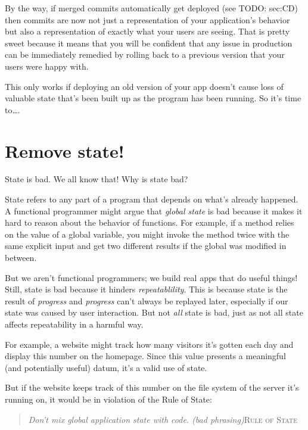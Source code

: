 \documentclass{article}
\newcommand{\noterm}[1]{\textit{#1}}
\newcommand{\term}[1]{\noterm{#1}\index{#1}}
\newcommand{\newp}{\newline\indent}
\newcommand{\imp}[2]{
  \begin{quote}
    \textit{#2}\newp \textsc{#1}
  \end{quote}
}
\begin{document}
By the way, if merged commits automatically get deployed (see TODO: sec:CD) then commits are now not just a representation of your application's behavior but also a representation of exactly what your users are seeing.
That is pretty sweet because it means that you will be confident that any issue in production can be immediately remedied by rolling back to a previous version that your users were happy with.

This only works if deploying an old version of your app doesn't cause loss of valuable state that's been built up as the program has been running.
So it's time to\ldots.

\section{Remove state!}

State is bad.
We all know that!
Why is state bad?

State refers to any part of a program that depends on what's already happened.
A functional programmer might argue that \textit{global state} is bad because it makes it hard to reason about the behavior of functions.
For example, if a method relies on the value of a global variable, you might invoke the method twice with the same explicit input and get two different results if the global was modified in between.

But we aren't functional programmers; we build real apps that do useful things!
Still, state is bad because it hinders \term{repeatablility}.
This is because state is the result of \term{progress} and \term{progress} can't always be replayed later, especially if our state was caused by user interaction.
But not \textit{all} state is bad, just as not all state affects repeatability in a harmful way.

For example, a website might track how many visitors it's gotten each day and display this number on the homepage.
Since this value presents a meaningful (and potentially useful) datum, it's a valid use of state.

But if the website keeps track of this number on the file system of the server it's running on, it would be in violation of the Rule of State:
\imp{Rule of State}{Don't mix global application state with code. (bad phrasing)}
\end{document}
